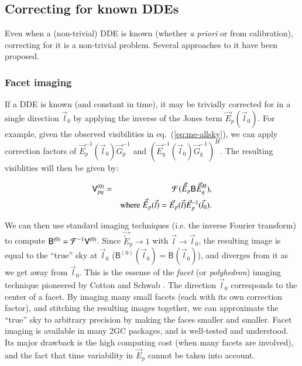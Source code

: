 \documentclass[]{aa}
\newcommand{\herm}{H}
\newcommand{\jones}[2]{\vec {#1}_{#2}}
\newcommand{\jonesinv}[2]{\vec {#1}^{-1}_{#2}}
\newcommand{\jonesT}[2]{\vec {#1}^{\herm}_{#2}}
\newcommand{\coh}[2]{\mathsf{{#1}}_{{#2}}}
\begin{document}
\subsection{Correcting for known DDEs\label{sec:dde-correction}}

Even when a (non-trivial) DDE is known (whether \emph{a priori} or from calibration), correcting for it is a non-trivial problem. Several approaches to it have been proposed.

\subsubsection{Facet imaging}

If a DDE is known (and constant in time), it may be trivially corrected for in a single direction $\vec l_0$ by applying the inverse of the Jones term $\jones{E}{p}(\vec l_0)$. For example, given the observed visibilities in eq.~(\ref{eq:me-allsky}), we can apply correction factors of $\jonesinv{E}{p}(\vec l_0)\jonesinv{G}{p}$ and $(\jonesinv{E}{q}(\vec l_0)\jonesinv{G}{q})^{\herm}$. The resulting visiblities will then be given by:

\begin{eqnarray*}
\coh{V}{pq}^{(0)} & = & {\cal F}( \jones{\tilde E}{p} \coh{B}{} \jonesT{\tilde E}{q} ), \\
 & & \mathrm{where} \; \jones{\tilde E}{p}(\vec l) = \jones{E}{p}(\vec l)\jonesinv{E}{p}(\vec l_0).
\end{eqnarray*}

We can then use standard imaging techniques (i.e. the inverse Fourier transform) to compute $\coh{B}{}^{(0)} = {\cal F}^{-1}\coh{V}{}^{(0)}$. Since $\jones{\tilde E}{p}\to1$ with $\vec l \to \vec l_0$, the resulting image is equal to the ``true'' sky at $\vec l_0$  ($\coh{B}{}^{(0)}(\vec l_0) =  \coh{B}{}(\vec l_0)$), and diverges from it as we get away from $\vec l_0$. This is the essense of the \emph{facet} (or \emph{polyhedron}) imaging technique pioneered by Cotton and Schwab \citep[for an overview, see][]{faceting}. The direction $\vec l_0$ corresponds to the center of a facet. By imaging many small facets (each with its own correction factor), and stitching the resulting images together, we can approximate the ``true'' sky to arbitrary precision by making the faces smaller and smaller. Facet imaging is available in many 2GC packages, and is well-tested and understood. Its major drawback is the high computing cost (when many facets are involved), and the fact that time variability in $\jones{E}{p}$ cannot be taken into account. 
\end{document}
